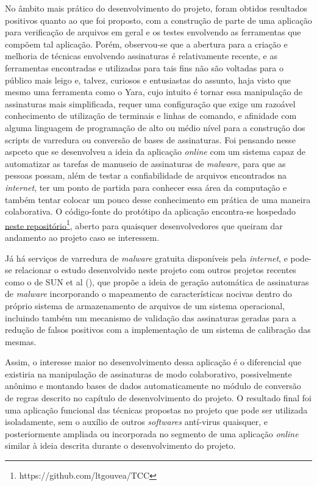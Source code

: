 No âmbito mais prático do desenvolvimento do projeto, foram obtidos resultados
positivos quanto ao que foi proposto, com a construção de parte de uma aplicação
para verificação de arquivos em geral e os testes envolvendo as ferramentas que
compõem tal aplicação. Porém, observou-se que a abertura para a criação e
melhoria de técnicas envolvendo assinaturas é relativamente recente, e as
ferramentas encontradas e utilizadas para tais fins não são voltadas para o
público mais leigo e, talvez, curiosos e entusiastas do assunto, haja visto que
mesmo uma ferramenta como o Yara, cujo intuito é tornar essa manipulação de
assinaturas mais simplificada, requer uma configuração que exige um razoável
conhecimento de utilização de terminais e linhas de comando, e afinidade com
alguma linguagem de programação de alto ou médio nível para a construção dos
scripts de varredura ou conversão de bases de assinaturas. Foi pensando nesse
aspceto que se desenvolveu a ideia da aplicação \textit{online} com um sistema
capaz de automatizar as tarefas de manuseio de assinaturas de \textit{malware},
para que as pessoas possam, além de testar a confiabilidade de arquivos
encontrados na \textit{internet}, ter um ponto de partida para conhecer essa
área da computação e também tentar colocar um pouco desse conhecimento em
prática de uma maneira colaborativa. O código-fonte do protótipo da aplicação
encontra-se hospedado \href{https://github.com/ltgouvea/TCC }{neste
repositório\footnote{https://github.com/ltgouvea/TCC}},  aberto para quaisquer desenvolvedores que queiram dar andamento
ao projeto caso se interessem.

Já há serviços de varredura de \textit{malware} gratuita disponíveis pela
\textit{internet}, e pode-se relacionar o estudo desenvolvido neste
projeto com outros projetos recentes como o de SUN et al (\citeyear{sun2012automated}),
que propõe a ideia de  geração automática de assinaturas de \textit{malware} incorporando
o mapeamento de características nocivas dentro do próprio sistema de armazenamento de arquivos
de um sistema operacional, incluindo também um mecanismo de validação das assinaturas
geradas para a redução de falsos positivos com a implementação de um sistema de calibração
das mesmas.

Assim, o interesse maior no desenvolvimento dessa aplicação é
o diferencial que existiria na manipulação de assinaturas de modo colaborativo,
possivelmente anônimo e montando bases de dados automaticamente no módulo de
conversão de regras descrito no capítulo de desenvolvimento do projeto. O
resultado final foi uma aplicação funcional das técnicas propostas no projeto
que pode ser utilizada isoladamente, sem o auxílio de outros \textit{softwares}
antí-virus quaisquer, e posteriormente ampliada ou incorporada no segmento de
uma aplicação \textit{online} similar à ideia descrita durante o desenvolvimento
do projeto.
